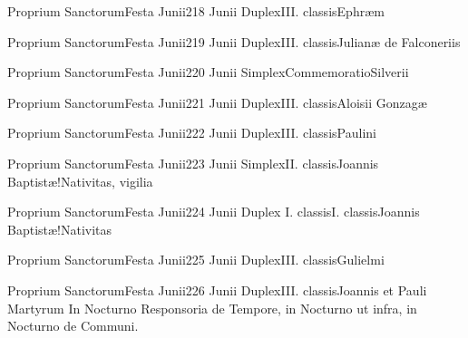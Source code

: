 \documentclass[liber-responsorialis_aestivus.tex]{subfiles}
\begin{document}
	{Proprium Sanctorum}{Festa Junii}{2}{18 Junii}
	{Duplex}{III. classis}{Ephræm}
	{\conpdorubric}
	{\respdetemp}

	{Proprium Sanctorum}{Festa Junii}{2}{19 Junii}
	{Duplex}{III. classis}{Julianæ de Falconeriis}
	{\vnrubric}
	{\respdetemp}

	{Proprium Sanctorum}{Festa Junii}{2}{20 Junii}
	{Simplex}{Commemoratio}{Silverii}
	{}
	{}
\rubric{\respdetemp}

	{Proprium Sanctorum}{Festa Junii}{2}{21 Junii}
	{Duplex}{III. classis}{Aloisii Gonzagæ}
	{\conprubric}
	{\respdetemp}

	{Proprium Sanctorum}{Festa Junii}{2}{22 Junii}
	{Duplex}{III. classis}{Paulini}
	{\coporubric}
	{\respdetemp}

	{Proprium Sanctorum}{Festa Junii}{2}{23 Junii}
	{Simplex}{II. classis}{Joannis Baptistæ!Nativitas, vigilia}
	{}
	{}
\rubric{\respdetemp}

	{Proprium Sanctorum}{Festa Junii}{2}{24 Junii}
	{Duplex I. classis}{I. classis}{Joannis Baptistæ!Nativitas}
	{}
	{}


	{Proprium Sanctorum}{Festa Junii}{2}{25 Junii}
	{Duplex}{III. classis}{Gulielmi}
	{\conprubric}
	{\respdetemp}

	{Proprium Sanctorum}{Festa Junii}{2}{26 Junii}
	{Duplex}{III. classis}{Joannis et Pauli Martyrum}
	{In  Nocturno Responsoria de Tempore, in  Nocturno ut infra, in  Nocturno de Communi.}
	{\respdetemp}
\end{document}
